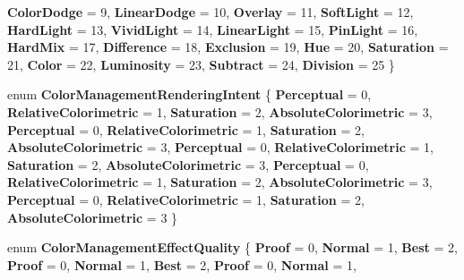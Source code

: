 \begin{DoxyCompactItemize}
{\bfseries Color\+Dodge} = 9, 
{\bfseries Linear\+Dodge} = 10, 
{\bfseries Overlay} = 11, 
\newline
{\bfseries Soft\+Light} = 12, 
{\bfseries Hard\+Light} = 13, 
{\bfseries Vivid\+Light} = 14, 
{\bfseries Linear\+Light} = 15, 
\newline
{\bfseries Pin\+Light} = 16, 
{\bfseries Hard\+Mix} = 17, 
{\bfseries Difference} = 18, 
{\bfseries Exclusion} = 19, 
\newline
{\bfseries Hue} = 20, 
{\bfseries Saturation} = 21, 
{\bfseries Color} = 22, 
{\bfseries Luminosity} = 23, 
\newline
{\bfseries Subtract} = 24, 
{\bfseries Division} = 25
 \}
\item 
\mbox{\label{namespace_microsoft_1_1_graphics_1_1_canvas_1_1_effects_a46519f571ff01b1f57ee3699fc97a7ce}} 
enum {\bfseries Color\+Management\+Rendering\+Intent} \{ \newline
{\bfseries Perceptual} = 0, 
{\bfseries Relative\+Colorimetric} = 1, 
{\bfseries Saturation} = 2, 
{\bfseries Absolute\+Colorimetric} = 3, 
\newline
{\bfseries Perceptual} = 0, 
{\bfseries Relative\+Colorimetric} = 1, 
{\bfseries Saturation} = 2, 
{\bfseries Absolute\+Colorimetric} = 3, 
\newline
{\bfseries Perceptual} = 0, 
{\bfseries Relative\+Colorimetric} = 1, 
{\bfseries Saturation} = 2, 
{\bfseries Absolute\+Colorimetric} = 3, 
\newline
{\bfseries Perceptual} = 0, 
{\bfseries Relative\+Colorimetric} = 1, 
{\bfseries Saturation} = 2, 
{\bfseries Absolute\+Colorimetric} = 3, 
\newline
{\bfseries Perceptual} = 0, 
{\bfseries Relative\+Colorimetric} = 1, 
{\bfseries Saturation} = 2, 
{\bfseries Absolute\+Colorimetric} = 3
 \}
\item 
\mbox{\label{namespace_microsoft_1_1_graphics_1_1_canvas_1_1_effects_a7a6e53eb824ad37f9b09d4149ae14d35}} 
enum {\bfseries Color\+Management\+Effect\+Quality} \{ \newline
{\bfseries Proof} = 0, 
{\bfseries Normal} = 1, 
{\bfseries Best} = 2, 
{\bfseries Proof} = 0, 
\newline
{\bfseries Normal} = 1, 
{\bfseries Best} = 2, 
{\bfseries Proof} = 0, 
{\bfseries Normal} = 1, 
\newline

\end{DoxyCompactItemize}
